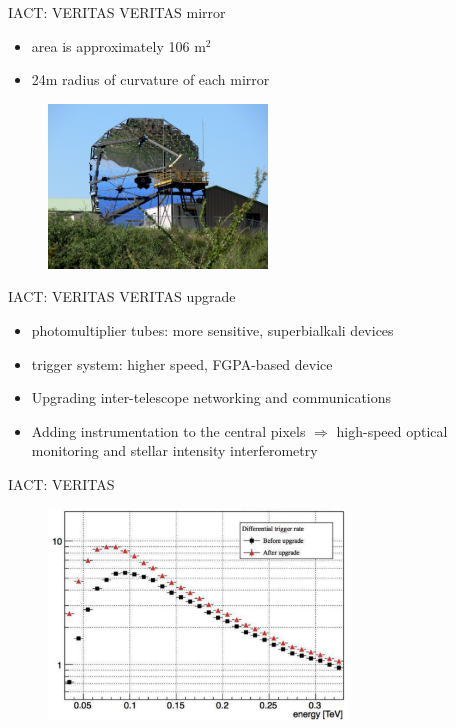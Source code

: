 \documentclass{beamer}
\begin{document}
\begin{frame}{IACT: VERITAS}
    VERITAS mirror
    \begin{itemize}
        \item area is approximately 106 $\text{m}^2$
        \item  24m radius of curvature of each mirror
    \end{itemize}

    \begin{figure}[h]
        \includegraphics[width=220px]{VERITAS_mirror.jpg}
    \end{figure}
\end{frame}


\begin{frame}{IACT: VERITAS}
    VERITAS upgrade
    \begin{itemize}
        \item  photomultiplier tubes: more sensitive, superbialkali devices
        \item trigger system: higher speed, FGPA-based device
        \item Upgrading inter-telescope networking and communications
        \item Adding instrumentation to the central pixels $\Rightarrow$ high-speed optical monitoring and stellar intensity interferometry
    \end{itemize}
\end{frame}



\begin{frame}{IACT: VERITAS}
    \begin{figure}[h]
        \includegraphics[width=300px]{VERITAS_upgrade.png}
    \end{figure}
\end{frame}
\end{document}
